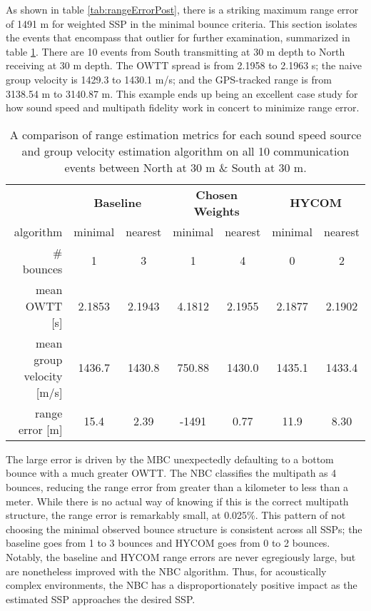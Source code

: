 As shown in table \ref{tab:rangeErrorPost}, there is a striking maximum range error of 1491 m for weighted SSP in the minimal bounce criteria.
This section isolates the events that encompass that outlier for further examination, summarized in table \ref{tab:rangeErrorPostExplanation}.
There are 10 events from South transmitting at 30 m depth to North receiving at 30 m depth.
The OWTT spread is from 2.1958 to 2.1963 s; the naive group velocity is 1429.3 to 1430.1 m/s; and the GPS-tracked range is from 3138.54 m to 3140.87 m.
This example ends up being an excellent case study for how sound speed and multipath fidelity work in concert to minimize range error.

\begin{table}[h!]
\renewcommand{\arraystretch}{1.5}
\centering
\begin{tabular}{r|cc|cc|cc}\toprule
 & \multicolumn{2}{c|}{\textbf{Baseline} } & \multicolumn{2}{c|}{\textbf{Chosen Weights} } & \multicolumn{2}{c}{\textbf{HYCOM}} \\
 algorithm & \cellcolor[HTML]{EFEFEF}minimal & nearest & \cellcolor[HTML]{EFEFEF} minimal& nearest & \cellcolor[HTML]{EFEFEF}minimal & nearest \\ \hline
 \# bounces 				& \cellcolor[HTML]{EFEFEF}1 		& 3 		& \cellcolor[HTML]{EFEFEF}1 		& 4 		& \cellcolor[HTML]{EFEFEF}0 	 & 2 \\
 mean OWTT [s] 				& \cellcolor[HTML]{EFEFEF}2.1853 	& 2.1943 	& \cellcolor[HTML]{EFEFEF}4.1812 	& 2.1955 	& \cellcolor[HTML]{EFEFEF}2.1877 & 2.1902 \\
 mean group velocity [m/s] 	& \cellcolor[HTML]{EFEFEF}1436.7 	& 1430.8 	& \cellcolor[HTML]{EFEFEF}750.88 	& 1430.0 	& \cellcolor[HTML]{EFEFEF}1435.1 & 1433.4 \\
 range error [m] 			& \cellcolor[HTML]{EFEFEF}15.4 		& 2.39 	 	& \cellcolor[HTML]{EFEFEF}-1491 	& 0.77 		& \cellcolor[HTML]{EFEFEF}11.9 & 8.30 \\
 \toprule
\end{tabular}
\caption[Further look at algorithm differences for one beacon to beacon pairing]{A comparison of range estimation metrics for each sound speed source and group velocity estimation algorithm on all 10 communication events between North at 30 m \& South at 30 m.}
\label{tab:rangeErrorPostExplanation}
\end{table}

The large error is driven by the MBC unexpectedly defaulting to a bottom bounce with a much greater OWTT.
The NBC classifies the multipath as 4 bounces, reducing the range error from greater than a kilometer to less than a meter.
While there is no actual way of knowing if this is the correct multipath structure, the range error is remarkably small, at 0.025\%. 
This pattern of not choosing the minimal observed bounce structure is consistent across all SSPs; the baseline goes from 1 to 3 bounces and HYCOM goes from 0 to 2 bounces.
Notably, the baseline and HYCOM range errors are never egregiously large, but are nonetheless improved with the NBC algorithm.
Thus, for acoustically complex environments, the NBC has a disproportionately positive impact as the estimated SSP approaches the desired SSP.

